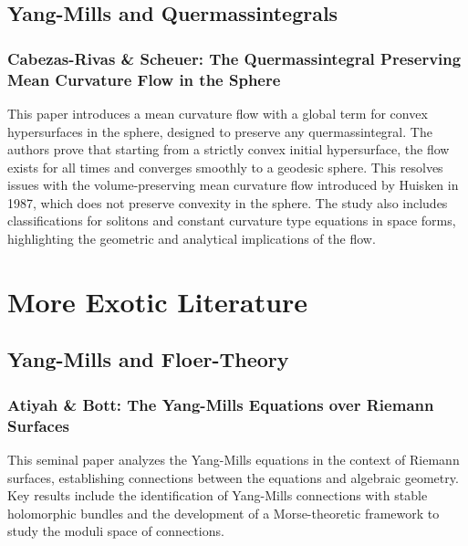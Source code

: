 \documentclass[10pt, letterpaper]{article}
\theoremstyle{custom}
\theoremstyle{definition}
\begin{document}
\subsection{Yang-Mills and Quermassintegrals}

\subsubsection{Cabezas-Rivas \& Scheuer: The Quermassintegral Preserving Mean Curvature Flow in the Sphere \cite{cabezasrivas2022quermassintegral}} 
This paper introduces a mean curvature flow with a global term for convex hypersurfaces in the sphere, designed to preserve any quermassintegral. The authors prove that starting from a strictly convex initial hypersurface, the flow exists for all times and converges smoothly to a geodesic sphere. This resolves issues with the volume-preserving mean curvature flow introduced by Huisken in 1987, which does not preserve convexity in the sphere. The study also includes classifications for solitons and constant curvature type equations in space forms, highlighting the geometric and analytical implications of the flow.






\vspace{1cm}





\section{More Exotic Literature}

\subsection{Yang-Mills and Floer-Theory}


\subsubsection{Atiyah \& Bott: The Yang-Mills Equations over Riemann Surfaces \cite{atiyah1983yangmills}} 
This seminal paper analyzes the Yang-Mills equations in the context of Riemann surfaces, establishing connections between the equations and algebraic geometry. Key results include the identification of Yang-Mills connections with stable holomorphic bundles and the development of a Morse-theoretic framework to study the moduli space of connections.
\end{document}
